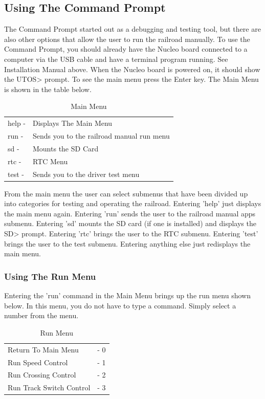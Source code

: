\documentclass[acmlarge,screen]{acmart}
\begin{document}
\subsection{Using The Command Prompt}
The Command Prompt started out as a debugging and testing tool, but there are also other options that allow the user to run the railroad manually. To use the Command Prompt, you should already have the Nucleo board connected to a computer via the USB cable and have a terminal program running. See Installation Manual above. When the Nucleo board is powered on, it should show the UTOS> prompt. To see the main menu press the Enter key. The Main Menu is shown in the table below.
\begin{table}[H]
\begin{tabular}{l l} 
help - & Displays The Main Menu\\
run - & Sends you to the railroad manual run menu\\
sd - & Mounts the SD Card\\
rtc - & RTC Menu \\
test - & Sends you to the driver test menu\\
\end{tabular}
\caption{Main Menu} 
\end{table}
From the main menu the user can select submenus that have been divided up into categories for testing and operating the railroad. Entering 'help' just displays the main menu again. Entering 'run' sends the user to the railroad manual apps submenu. Entering 'sd' mounts the SD card (if one is installed) and displays the SD> prompt. Entering 'rtc' brings the user to the RTC submenu. Entering 'test' brings the user to the test submenu. Entering anything else just redisplays the main menu.\\
\subsubsection{Using The Run Menu}
Entering the 'run' command in the Main Menu brings up the run menu shown below. In this menu, you do not have to type a command. Simply select a number from the menu.
\begin{table}[H]
\begin{tabular}{l l} 
Return To Main Menu & - 0 \\
Run Speed Control & - 1\\
Run Crossing Control & - 2\\
Run Track Switch Control & - 3 \\
\end{tabular} 
\caption{Run Menu}
\end{table}
\end{document}
